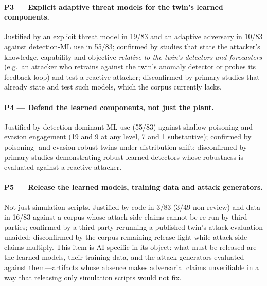 \documentclass[preprint,12pt]{elsarticle}
\renewcommand{\_}{\plainunderscore\allowbreak}
\begin{document}
\paragraph{P3 --- Explicit adaptive threat models for the twin's learned components.}
Justified by an explicit threat model in 19/83 and an adaptive adversary in 10/83 against
  detection-ML use in 55/83; confirmed by studies that state the attacker's knowledge,
  capability and objective \emph{relative to the twin's detectors and forecasters} (e.g.\ an
  attacker who retrains against the twin's anomaly detector or probes its feedback loop) and
  test a reactive attacker; disconfirmed by primary studies that already state and test such
  models, which the corpus currently lacks.
\paragraph{P4 --- Defend the learned components, not just the plant.}
Justified by detection-dominant ML use (55/83) against shallow poisoning and evasion
  engagement (19 and 9 at any level, 7 and 1 substantive); confirmed by poisoning- and
  evasion-robust twins under distribution shift; disconfirmed by primary studies demonstrating
  robust learned detectors whose robustness is evaluated against a reactive attacker.
\paragraph{P5 --- Release the learned models, training data and attack generators.}
Not just simulation scripts. Justified by code in 3/83 (3/49 non-review) and data in
  16/83 against a corpus whose attack-side claims cannot be re-run by third parties;
  confirmed by a third party rerunning a published twin's attack evaluation unaided;
  disconfirmed by the corpus remaining release-light while attack-side claims multiply.
  This item is AI-specific in its object: what must be released are the learned models,
  their training data, and the attack generators evaluated against them---artifacts whose
  absence makes adversarial claims unverifiable in a way that releasing only simulation
  scripts would not fix.
\end{document}

